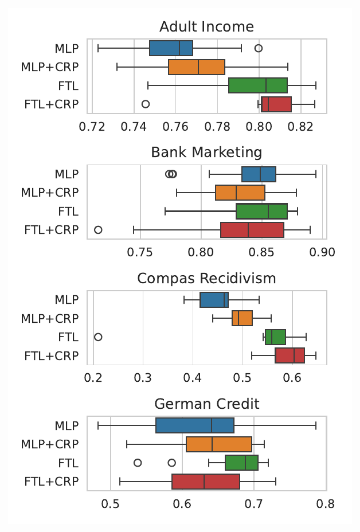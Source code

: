\begin{figure}[!ht]
\begin{subfigure}{.32\linewidth}
    \includegraphics[width=1\linewidth]{images/boxplot_acc_odds_crp.pdf}
\end{subfigure}
\end{figure}



